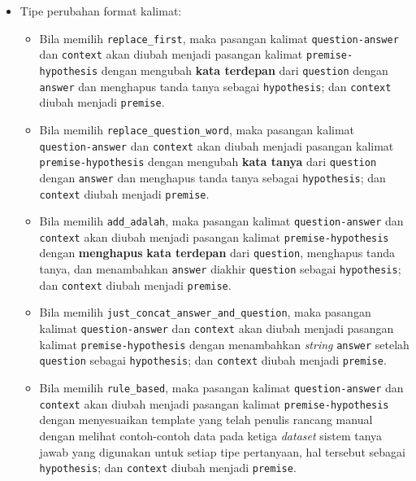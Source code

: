 \begin{itemize}
\begin{itemize}
    \item Tipe perubahan format kalimat:
    \begin{itemize}
        \item Bila memilih \texttt{replace\_first}, maka pasangan kalimat \texttt{question-answer} dan \texttt{context} akan diubah menjadi pasangan kalimat \texttt{premise-hypothesis} dengan mengubah \textbf{kata terdepan} dari \texttt{question} dengan \texttt{answer} dan menghapus tanda tanya sebagai \texttt{hypothesis}; dan \texttt{context} diubah menjadi \texttt{premise}.
        
        \item Bila memilih \texttt{replace\_question\_word}, maka pasangan kalimat \texttt{question-answer} dan \texttt{context} akan diubah menjadi pasangan kalimat \texttt{premise-hypothesis} dengan mengubah \textbf{kata tanya} dari \texttt{question} dengan \texttt{answer} dan menghapus tanda tanya sebagai \texttt{hypothesis}; dan \texttt{context} diubah menjadi \texttt{premise}.
        
        \item  Bila memilih \texttt{add\_adalah}, maka pasangan kalimat \texttt{question-answer} dan \texttt{context} akan diubah menjadi pasangan kalimat \texttt{premise-hypothesis} dengan \textbf{menghapus} \textbf{kata terdepan} dari \texttt{question}, menghapus tanda tanya, dan menambahkan \texttt{answer} diakhir \texttt{question} sebagai \texttt{hypothesis}; dan \texttt{context} diubah menjadi \texttt{premise}.
        
        \item Bila memilih \texttt{just\_concat\_answer\_and\_question}, maka pasangan kalimat \texttt{question-answer} dan \texttt{context} akan diubah menjadi pasangan kalimat \texttt{premise-hypothesis} dengan menambahkan \emph{string} \texttt{answer} setelah \texttt{question} sebagai \texttt{hypothesis}; dan \texttt{context} diubah menjadi \texttt{premise}.
        
        \item  Bila memilih \texttt{rule\_based}, maka pasangan kalimat \texttt{question-answer} dan \texttt{context} akan diubah menjadi pasangan kalimat \texttt{premise-hypothesis} dengan menyesuaikan template yang telah penulis rancang manual dengan melihat contoh-contoh data pada ketiga \emph{dataset} sistem tanya jawab yang digunakan untuk setiap tipe pertanyaan, hal tersebut sebagai \texttt{hypothesis}; dan \texttt{context} diubah menjadi \texttt{premise}.
        

\end{itemize}
\end{itemize}
\end{itemize}
